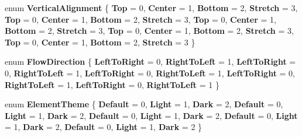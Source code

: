 \begin{DoxyCompactItemize}
\mbox{\label{namespace_windows_1_1_u_i_1_1_xaml_adfb3c11d5572410fe610ae02feb31cd1}} 
enum {\bfseries Vertical\+Alignment} \{ \newline
{\bfseries Top} = 0, 
{\bfseries Center} = 1, 
{\bfseries Bottom} = 2, 
{\bfseries Stretch} = 3, 
\newline
{\bfseries Top} = 0, 
{\bfseries Center} = 1, 
{\bfseries Bottom} = 2, 
{\bfseries Stretch} = 3, 
\newline
{\bfseries Top} = 0, 
{\bfseries Center} = 1, 
{\bfseries Bottom} = 2, 
{\bfseries Stretch} = 3, 
\newline
{\bfseries Top} = 0, 
{\bfseries Center} = 1, 
{\bfseries Bottom} = 2, 
{\bfseries Stretch} = 3, 
\newline
{\bfseries Top} = 0, 
{\bfseries Center} = 1, 
{\bfseries Bottom} = 2, 
{\bfseries Stretch} = 3
 \}
\item 
\mbox{\label{namespace_windows_1_1_u_i_1_1_xaml_a05520a61af727955c4e50fc1f58fb7db}} 
enum {\bfseries Flow\+Direction} \{ \newline
{\bfseries Left\+To\+Right} = 0, 
{\bfseries Right\+To\+Left} = 1, 
{\bfseries Left\+To\+Right} = 0, 
{\bfseries Right\+To\+Left} = 1, 
\newline
{\bfseries Left\+To\+Right} = 0, 
{\bfseries Right\+To\+Left} = 1, 
{\bfseries Left\+To\+Right} = 0, 
{\bfseries Right\+To\+Left} = 1, 
\newline
{\bfseries Left\+To\+Right} = 0, 
{\bfseries Right\+To\+Left} = 1
 \}
\item 
\mbox{\label{namespace_windows_1_1_u_i_1_1_xaml_a7e1a4f3aaa641c44365e5b007c4d84ce}} 
enum {\bfseries Element\+Theme} \{ \newline
{\bfseries Default} = 0, 
{\bfseries Light} = 1, 
{\bfseries Dark} = 2, 
{\bfseries Default} = 0, 
\newline
{\bfseries Light} = 1, 
{\bfseries Dark} = 2, 
{\bfseries Default} = 0, 
{\bfseries Light} = 1, 
\newline
{\bfseries Dark} = 2, 
{\bfseries Default} = 0, 
{\bfseries Light} = 1, 
{\bfseries Dark} = 2, 
\newline
{\bfseries Default} = 0, 
{\bfseries Light} = 1, 
{\bfseries Dark} = 2
 \}
\item 
\mbox{\label{namespace_windows_1_1_u_i_1_1_xaml_a1ea241d4a0cb7c10af82c7b36d2806bc}} 

\end{DoxyCompactItemize}
